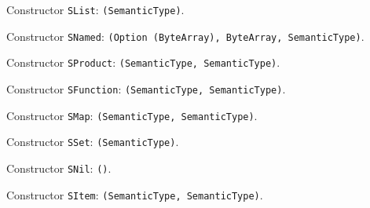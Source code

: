 \documentclass[11pt]{article}
\begin{document}
\noindent Constructor \texttt{SList}: \texttt{(SemanticType)}.\par
\noindent Constructor \texttt{SNamed}: \texttt{(Option (ByteArray), ByteArray, SemanticType)}.\par
\noindent Constructor \texttt{SProduct}: \texttt{(SemanticType, SemanticType)}.\par
\noindent Constructor \texttt{SFunction}: \texttt{(SemanticType, SemanticType)}.\par
\noindent Constructor \texttt{SMap}: \texttt{(SemanticType, SemanticType)}.\par
\noindent Constructor \texttt{SSet}: \texttt{(SemanticType)}.\par
\noindent Constructor \texttt{SNil}: \texttt{()}.\par
\noindent Constructor \texttt{SItem}: \texttt{(SemanticType, SemanticType)}.\par
\end{document}
